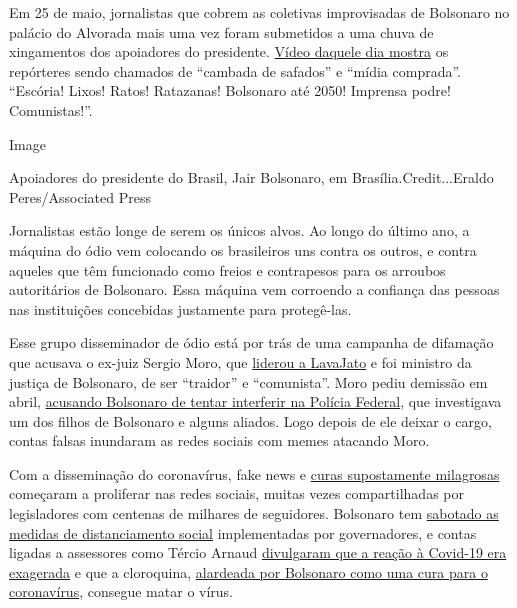 Em 25 de maio, jornalistas que cobrem as coletivas improvisadas de
Bolsonaro no palácio do Alvorada mais uma vez foram submetidos a uma
chuva de xingamentos dos apoiadores do presidente.
\href{https://twitter.com/folha/status/1264913877399212034}{Vídeo
daquele dia mostra} os repórteres sendo chamados de ``cambada de
safados'' e ``mídia comprada''. ``Escória! Lixos! Ratos! Ratazanas!
Bolsonaro até 2050! Imprensa podre! Comunistas!''.

Image

Apoiadores do presidente do Brasil, Jair Bolsonaro, em
Brasília.Credit...Eraldo Peres/Associated Press

Jornalistas estão longe de serem os únicos alvos. Ao longo do último
ano, a máquina do ódio vem colocando os brasileiros uns contra os
outros, e contra aqueles que têm funcionado como freios e contrapesos
para os arroubos autoritários de Bolsonaro. Essa máquina vem corroendo a
confiança das pessoas nas instituições concebidas justamente para
protegê-las.

Esse grupo disseminador de ódio está por trás de uma campanha de
difamação que acusava o ex-juiz Sergio Moro, que
\href{https://www.nytimes.com/2017/09/18/opinion/brazil-corruption-car-wash.html?searchResultPosition=1}{liderou
a LavaJato} e foi ministro da justiça de Bolsonaro, de ser ``traidor'' e
``comunista''. Moro pediu demissão em abril,
\href{https://www.nytimes.com/2017/09/18/opinion/brazil-corruption-car-wash.html?searchResultPosition=1}{acusando
Bolsonaro de tentar interferir na Polícia Federal}, que investigava um
dos filhos de Bolsonaro e alguns aliados. Logo depois de ele deixar o
cargo, contas falsas inundaram as redes sociais com memes atacando Moro.

Com a disseminação do coronavírus, fake news e
\href{https://www.bbc.com/news/53361876}{curas supostamente milagrosas}
começaram a proliferar nas redes sociais, muitas vezes compartilhadas
por legisladores com centenas de milhares de seguidores. Bolsonaro tem
\href{https://www.hrw.org/news/2020/04/10/brazil-bolsonaro-sabotages-anti-covid-19-efforts}{sabotado
as medidas de distanciamento social} implementadas por governadores, e
contas ligadas a assessores como Tércio Arnaud
\href{https://www.bbc.com/portuguese/brasil-53353594}{divulgaram que a
reação à Covid-19 era exagerada} e que a cloroquina,
\href{https://www.nytimes.com/2020/06/13/world/americas/virus-brazil-bolsonaro-chloroquine.html}{alardeada
por Bolsonaro como uma cura para o coronavírus}, consegue matar o vírus.

